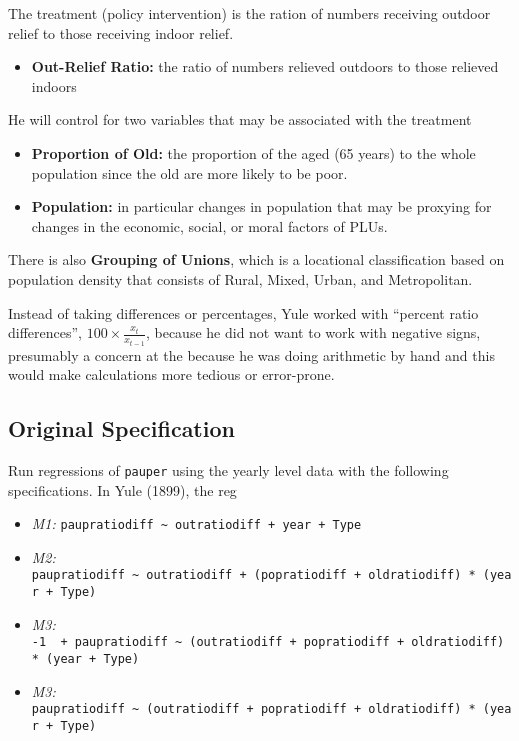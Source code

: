 \documentclass[]{article}
\providecommand{\tightlist}{%
  \setlength{\itemsep}{0pt}\setlength{\parskip}{0pt}}
\begin{document}
The treatment (policy intervention) is the ration of numbers receiving
outdoor relief to those receiving indoor relief.

\begin{itemize}
\tightlist
\item
  \textbf{Out-Relief Ratio:} the ratio of numbers relieved outdoors to
  those relieved indoors
\end{itemize}

He will control for two variables that may be associated with the
treatment

\begin{itemize}
\tightlist
\item
  \textbf{Proportion of Old:} the proportion of the aged (65 years) to
  the whole population since the old are more likely to be poor.
\item
  \textbf{Population:} in particular changes in population that may be
  proxying for changes in the economic, social, or moral factors of
  PLUs.
\end{itemize}

There is also \textbf{Grouping of Unions}, which is a locational
classification based on population density that consists of Rural,
Mixed, Urban, and Metropolitan.

Instead of taking differences or percentages, Yule worked with ``percent
ratio differences'', \(100 \times \frac{x_{t}}{x_{t-1}}\), because he
did not want to work with negative signs, presumably a concern at the
because he was doing arithmetic by hand and this would make calculations
more tedious or error-prone.

\subsection{Original Specification}\label{original-specification}

Run regressions of \texttt{pauper} using the yearly level data with the
following specifications. In Yule (1899), the reg

\begin{itemize}
\tightlist
\item
  \emph{M1:}
  \texttt{paupratiodiff\ \textasciitilde{}\ outratiodiff\ +\ year\ +\ Type}
\item
  \emph{M2:}
  \texttt{paupratiodiff\ \textasciitilde{}\ outratiodiff\ +\ (popratiodiff\ +\ oldratiodiff)\ *\ (year\ +\ Type)}
\item
  \emph{M3:}
  \texttt{-1\ \ +\ paupratiodiff\ \textasciitilde{}\ (outratiodiff\ +\ popratiodiff\ +\ oldratiodiff)\ *\ (year\ +\ Type)}
\item
  \emph{M3:}
  \texttt{paupratiodiff\ \textasciitilde{}\ (outratiodiff\ +\ popratiodiff\ +\ oldratiodiff)\ *\ (year\ +\ Type)}
\end{itemize}
\end{document}
